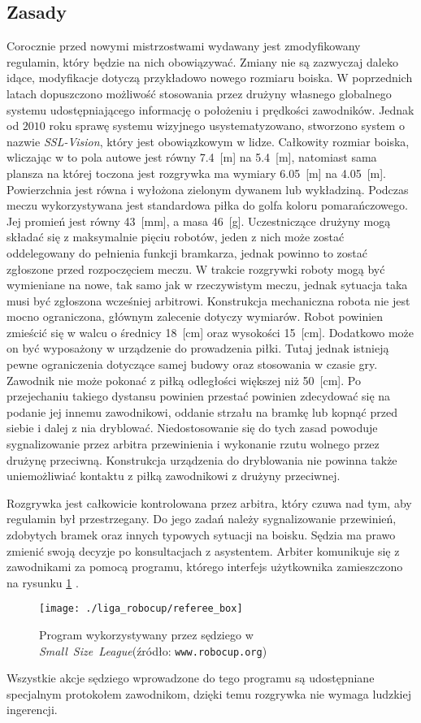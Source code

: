 	\subsection{Zasady}
	Corocznie przed nowymi mistrzostwami wydawany jest zmodyfikowany regulamin, który będzie na nich obowiązywać. Zmiany nie są zazwyczaj daleko idące, modyfikacje dotyczą przykładowo nowego rozmiaru boiska.
	W poprzednich latach dopuszczono możliwość stosowania przez drużyny własnego globalnego systemu udostępniającego informację o położeniu i prędkości zawodników.
	Jednak od $2010$ roku sprawę systemu wizyjnego usystematyzowano, stworzono system o nazwie \textit{SSL-Vision}, który jest obowiązkowym w lidze. 
	Całkowity rozmiar boiska, wliczając w to pola autowe jest równy 7.4~[m] na 5.4~[m], natomiast sama plansza na której toczona jest rozgrywka ma wymiary 6.05~[m] na 4.05~[m].
	Powierzchnia jest równa i  wyłożona zielonym dywanem lub wykładziną. Podczas meczu wykorzystywana jest standardowa piłka do golfa koloru pomarańczowego. Jej promień jest równy 43~[mm], a masa
	46~[g].
	Uczestniczące drużyny mogą składać się z maksymalnie pięciu robotów, jeden z nich może zostać oddelegowany do pełnienia
	funkcji bramkarza, jednak powinno to zostać zgłoszone przed rozpoczęciem meczu. W trakcie rozgrywki roboty mogą być wymieniane na nowe, tak samo jak w rzeczywistym meczu, jednak 
	sytuacja taka musi być zgłoszona wcześniej arbitrowi.
	Konstrukcja mechaniczna robota nie jest mocno ograniczona, głównym zalecenie dotyczy wymiarów. Robot powinien zmieścić się w walcu o średnicy 18~[cm] oraz wysokości 15~[cm].
	Dodatkowo może on być wyposażony w urządzenie do prowadzenia piłki. Tutaj jednak istnieją pewne ograniczenia dotyczące
	samej budowy oraz stosowania w czasie gry. Zawodnik nie może pokonać z piłką odległości większej niż 50~[cm]. Po przejechaniu takiego dystansu powinien przestać powinien zdecydować się
	na podanie jej innemu zawodnikowi, oddanie strzału na bramkę lub kopnąć przed siebie i dalej z nia dryblować. Niedostosowanie się do tych zasad powoduje sygnalizowanie przez arbitra
	przewinienia i wykonanie rzutu wolnego przez drużynę przeciwną. Konstrukcja urządzenia do dryblowania nie powinna także uniemożliwiać kontaktu z piłką zawodnikowi z drużyny przeciwnej.
		
	Rozgrywka jest całkowicie kontrolowana przez arbitra, który czuwa nad tym, aby  regulamin był przestrzegany. Do
	jego zadań należy sygnalizowanie przewinień, zdobytych bramek oraz innych typowych sytuacji na boisku.
	Sędzia ma prawo zmienić swoją decyzje po konsultacjach z asystentem. Arbiter komunikuje się z zawodnikami za pomocą programu, którego interfejs użytkownika zamieszczono na rysunku \ref{fig:referee_box} .
	\begin{figure}[H]
	\centering
	\texttt{[image: ./liga\_robocup/referee\_box]}
	\caption{Program wykorzystywany przez sędziego w  \mbox{\emph{Small Size League}}\newline(źródło: \texttt{www.robocup.org}) }
	\label{fig:referee_box}
	\end{figure} 
	Wszystkie akcje sędziego wprowadzone do tego programu są udostępniane specjalnym protokołem zawodnikom, dzięki temu rozgrywka nie wymaga ludzkiej ingerencji.
